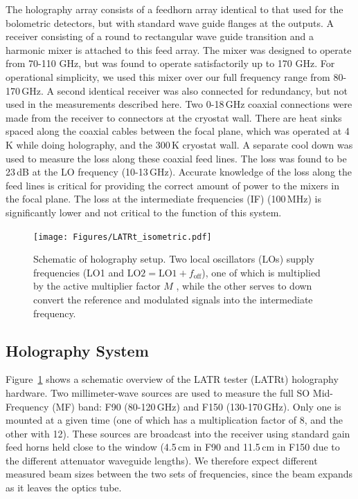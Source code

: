 The holography array consists of a feedhorn array identical to that used for the bolometric detectors, but with standard wave guide flanges at the outputs. A receiver consisting of a round to rectangular wave guide transition and a harmonic mixer is attached to this feed array.  The mixer was designed to operate from 70-110 GHz, but was found to operate satisfactorily up to 170 GHz. For operational simplicity, we used this mixer over our full frequency range from 80-170\,GHz.
A second identical receiver was also connected for redundancy, but not used in the measurements described here.   Two 0-18\,GHz coaxial connections were made from the receiver to connectors at the cryostat wall.  There are heat sinks spaced along the coaxial cables between the focal plane, which was operated at 4\,K while doing holography, and the 300\,K cryostat wall.  A separate cool down was used to measure the loss along these coaxial feed lines.  The loss  was found to be 23\,dB at the LO frequency (10-13\,GHz).  Accurate knowledge of the loss along the feed lines is critical for providing the correct amount of power to the mixers in the focal plane.  The loss at the intermediate frequencies (IF) (100\,MHz) is significantly lower and not critical to the function of this system.


\begin{figure}
    \centering
    \texttt{[image: Figures/LATRt\_isometric.pdf]}
    \caption{Schematic of holography setup.  Two local oscillators (LOs) supply frequencies (LO1 and $\text{LO2} = \text{LO1} + f_{\text{off}}$), one of which is multiplied by the active multiplier factor $M$ , while the other serves to down convert the reference and modulated signals into the intermediate frequency.}
    \label{fig:setup}
\end{figure}

\subsection{Holography System}
\label{sec:meas_hardware}

Figure~\ref{fig:setup} shows a schematic overview of the LATR tester (LATRt) holography hardware.  Two millimeter-wave sources are used to measure the full SO Mid-Frequency (MF) band: F90 (80-120\,GHz) and F150 (130-170\,GHz).  Only one is mounted at a given time (one of which has a multiplication factor of 8, and the other with 12).  These sources are broadcast into the receiver using standard gain feed horns held close to the window (4.5\,cm in F90 and 11.5\,cm in F150 due to the different attenuator waveguide lengths).  We therefore expect different measured beam sizes between the two sets of frequencies, since the beam expands as it leaves the optics tube.
 
